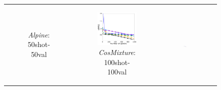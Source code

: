 {\begin{figure}[t]
\begin{tabular}[c]{cccc}
\begin{subfigure}[t]{0.25\textwidth}
		\caption{\small \textit{Alpine}: 50shot-50val}
	\end{subfigure}
		&
		\begin{subfigure}[t]{0.25\textwidth}
			\centering
			\includegraphics[width=\textwidth]{./figs/icml22/CosMixture2D-100shot-100query-500inners-trim.pdf}
			\caption{\small \textit{CosMixture}: 100shot-100val}
		\end{subfigure}  
		&
		\begin{subfigure}[t]{0.25\textwidth}
			\centering
			\includegraphics[width=\textwidth]{./figs/icml22/Alpine2D-100shot-100query-500inners-trim.pdf}

\end{subfigure}
\end{tabular}
\end{figure}}
